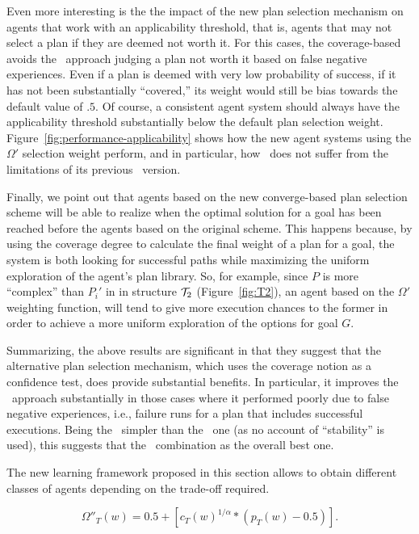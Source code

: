 Even more interesting is the the impact of the new plan selection mechanism on
agents that work with an applicability threshold, that is, agents that may not
select a plan if they are deemed not worth it. For this cases, the coverage-based
avoids the \CL\ approach judging a plan not worth it based on false negative
experiences. Even if a plan is deemed with very low probability of success, if it
has not been substantially ``covered,'' its weight would still be bias towards the
default value of $.5$. Of course, a consistent agent system should always have
the applicability threshold substantially below the default plan selection
weight.
Figure~\ref{fig:performance-applicability} shows how the new agent systems
using the $\Omega'$ selection weight perform, and in particular, how \CLSELB\
does not suffer from the limitations of its previous \CLSELA\ version.


Finally, we point out that agents based on the new converge-based plan selection
scheme will be able to realize when the optimal solution for a goal has been
reached before the agents based on the original scheme.
This happens because, by using the coverage degree to calculate the final weight
of a plan for a goal, the system is both looking for successful paths while
maximizing    the uniform exploration of the agent's plan library.
So, for example, since $P$ is more ``complex'' than $P_i'$ in in structure ${\mathcal{T}}_2$
(Figure~\ref{fig:T2}), an agent based on the $\Omega'$ weighting function, will
tend to give more execution chances to the former in order to achieve a more
uniform exploration of the options for goal $G$.



 

Summarizing, the above results are significant in that they suggest that the
alternative plan selection mechanism, which uses the coverage notion as a
confidence test, does provide substantial benefits. In particular, it improves
the \CL\ approach substantially in those cases where it performed poorly due to
false negative experiences, i.e., failure runs for a plan that includes
successful executions.  Being the \CL\  simpler than the \BUL\ one (as no account
of ``stability'' is used), this suggests that the \CLSELB\ combination as the
overall best one.


The new learning framework proposed in this section allows to obtain different
classes of agents depending on the trade-off required.


\begin{equation*}\label{eqn:coverage}   
\Omega''_T(w) = 0.5 + \left[  c_T(w)^{1/\alpha} *  \left( p_T(w) - 0.5 \right) 
\right].
\end{equation*}

